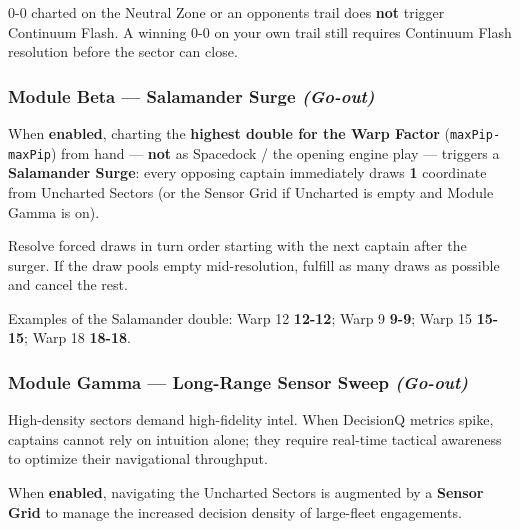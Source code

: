 \documentclass[11pt]{article}
\begin{document}
0-0 charted on the Neutral Zone or an opponent\textquotesingle s trail
does \textbf{not} trigger Continuum Flash. A winning 0-0 on your own
trail still requires Continuum Flash resolution before the sector can
close.

\subsubsection{Module Beta --- Salamander Surge
\emph{(Go-out)}}\label{module-beta--salamander-surge-go-out}

When \textbf{enabled}, charting the \textbf{highest double for the Warp
Factor} (\texttt{maxPip-maxPip}) from hand --- \textbf{not} as Spacedock
/ the opening engine play --- triggers a \textbf{Salamander Surge}:
every opposing captain immediately draws \textbf{1} coordinate from
Uncharted Sectors (or the Sensor Grid if Uncharted is empty and Module
Gamma is on).

Resolve forced draws in turn order starting with the next captain after
the surger. If the draw pools empty mid-resolution, fulfill as many
draws as possible and cancel the rest.

Examples of the Salamander double: Warp 12 \textbf{12-12}; Warp 9
\textbf{9-9}; Warp 15 \textbf{15-15}; Warp 18 \textbf{18-18}.

\subsubsection{Module Gamma --- Long-Range Sensor Sweep
\emph{(Go-out)}}\label{module-gamma--long-range-sensor-sweep-go-out}

High-density sectors demand high-fidelity intel. When DecisionQ metrics
spike, captains cannot rely on intuition alone; they require real-time
tactical awareness to optimize their navigational throughput.

When \textbf{enabled}, navigating the Uncharted Sectors is augmented by
a \textbf{Sensor Grid} to manage the increased decision density of
large-fleet engagements.
\end{document}
